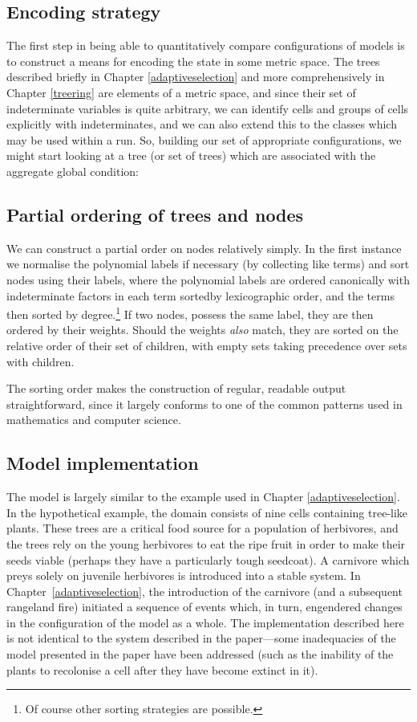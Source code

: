 \subsection{Encoding strategy}
The first step in being able to quantitatively compare configurations
of models is to construct a means for encoding the state in some
metric space.  The trees described briefly in Chapter
\ref{adaptiveselection} and more comprehensively in Chapter
\ref{treering} are elements of a metric space, and since their set of
indeterminate variables is quite arbitrary, we can identify cells and
groups of cells explicitly with indeterminates, and we can also extend
this to the classes which may be used within a run.  So, building our
set of appropriate configurations, we might start looking at a tree
(or set of trees) which are associated with the aggregate global
condition:

\subsection{Partial ordering of trees and nodes}\label{partial-order}
We can construct a partial order on nodes relatively simply.  In the
first instance we normalise the polynomial labels if necessary (by
collecting like terms) and sort nodes using their labels, where the polynomial labels are
ordered canonically with indeterminate factors in each term sortedby
lexicographic order, and the terms then sorted by degree.\footnote{Of course
other sorting strategies are possible.} If two nodes, possess the same
label, they are then ordered by their weights.  Should the weights
\emph{also} match, they are sorted on the relative order of their set
of children, with empty sets taking precedence over sets with
children.

The sorting order makes the construction of regular, readable output
straightforward, since it largely conforms to one of the common
patterns used in mathematics and computer science. 

\subsection{Model implementation}

The model is largely similar to the example used in Chapter
\ref{adaptiveselection}. In the hypothetical example, the domain
consists of nine cells containing tree-like plants. These trees are a
critical food source for a population of herbivores, and the trees
rely on the young herbivores to eat the ripe fruit in order to make
their seeds viable (perhaps they have a particularly tough
seedcoat). A carnivore which preys solely on juvenile herbivores is
introduced into a stable system.  In Chapter~\ref{adaptiveselection},
the introduction of the carnivore (and a subsequent rangeland fire)
initiated a sequence of events which, in turn, engendered
changes in the configuration of the model as a whole.  The
implementation described here is not identical to the system described
in the paper---some inadequacies of the model presented in the paper
have been addressed (such as the inability of the plants to recolonise
a cell after they have become extinct in it).

